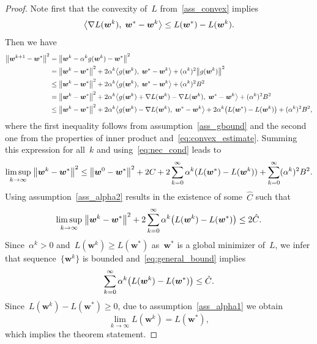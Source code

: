 \begin{proof}
  Note first that the convexity of~$L$ from~\ref{ass_convex} implies
  \begin{equation}\label{eq:convex_estimate}
    \inner{\nabla L(\bm{w}^k)}{\bm{w}^* - \bm{w}^k} \leq L(\bm{w}^*) - L(\bm{w}^k).
  \end{equation}
  Then we have
  \begin{align*}
    \norm{\bm{w}^{k+1} - \bm{w}^*}^2
      & = \norm{\bm{w}^k - \alpha^k g(\bm{w}^k) - \bm{w}^*}^2 \\
      & = \norm{\bm{w}^k - \bm{w}^*}^2 + 2\alpha^k\inner{g(\bm{w}^k)}{\bm{w}^* - \bm{w}^k} + (\alpha^k)^2 \norm{g(\bm{w}^k)}^2 \\
      & \leq \norm{\bm{w}^k - \bm{w}^*}^2 + 2\alpha^k\inner{g(\bm{w}^k)}{\bm{w}^* - \bm{w}^k} + (\alpha^k)^2 B^2\\
      & = \norm{\bm{w}^k - \bm{w}^*}^2 + 2\alpha^k\inner{g(\bm{w}^k) + \nabla L(\bm{w}^k) - \nabla L(\bm{w}^k)}{\bm{w}^* - \bm{w}^k} + (\alpha^k)^2 B^2\\
      & \leq \norm{\bm{w}^k - \bm{w}^*}^2 + 2 \alpha^k \inner{g(\bm{w}^k) - \nabla L(\bm{w}^k)}{\bm{w}^* - \bm{w}^k} + 2 \alpha^k \Brac{L(\bm{w}^*) - L(\bm{w}^k)} + (\alpha^k)^2 B^2,
  \end{align*}
  where the first inequality follows from assumption~\ref{ass_gbound} and the second one from the properties of inner product and~\eqref{eq:convex_estimate}. Summing this expression for all~$k$ and using~\eqref{eq:nec_cond} leads to
  \begin{equation*}
    \limsup_{k \rightarrow \infty} \; \norm{\bm{w}^k - \bm{w}^*}^2
      \leq \norm{\bm{w}^0 - \bm{w}^*}^2 + 2C + 2 \sum_{k=0}^\infty \alpha^k (L(\bm{w}^*) - L(\bm{w}^k)) + \sum_{k=0}^ \infty (\alpha^k)^2 B^2.
  \end{equation*}
  Using assumption~\ref{ass_alpha2} results in the existence of some~$\hat{C}$ such that
  \begin{equation}\label{eq:general_bound}
  \limsup_{k \rightarrow \infty} \;\norm{\bm{w}^k - \bm{w}^*}^2 + 2\sum_{k=0}^\infty \alpha^k \Brac{L(\bm{w}^k) - L(\bm{w}^*)} \leq 2 \hat{C}.
  \end{equation}
  Since~$\alpha^k > 0$ and~$L(\bm{w}^k) \geq L(\bm{w}^*)$ as~$\bm{w}^*$ is a global minimizer of~$L$, we infer that sequence~$\{\bm{w}^k\}$ is bounded and~\eqref{eq:general_bound} implies
  \begin{equation*}
    \sum_{k=0}^\infty \alpha^k \Brac{L(\bm{w}^k) - L(\bm{w}^*)} \leq \hat{C}.
  \end{equation*}
  Since~$L(\bm{w}^k) - L(\bm{w}^*) \geq 0$, due to assumption~\ref{ass_alpha1} we obtain
  \begin{equation*}
    \lim_{k \to \infty} L(\bm{w}^k) = L(\bm{w}^*),
  \end{equation*}
  which implies the theorem statement.
\end{proof}

